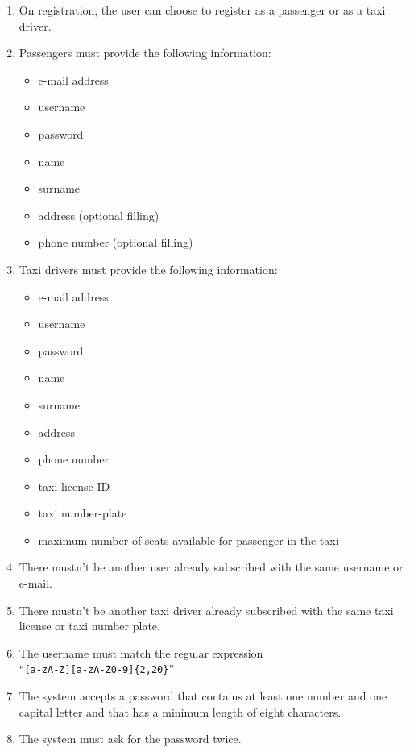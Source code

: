 \begin{enumerate}
    \item On registration, the user can choose to register as a passenger or as a taxi driver.
    \item Passengers must provide the following information:
    \begin{itemize}
        \item e-mail address
        \item username
        \item password
        \item name
        \item surname
        \item address (optional filling)
        \item phone number (optional filling)
    \end{itemize}
    \item Taxi drivers must provide the following information:
    \begin{itemize}
        \item e-mail address
        \item username
        \item password
        \item name
        \item surname
        \item address
        \item phone number
        \item taxi license ID
        \item taxi number-plate
        \item maximum number of seats available for passenger in the taxi
	   \end{itemize}
    \item There mustn't be another user already subscribed with the same username or e-mail. \label{f-sameInfo}
    \item There mustn't be another taxi driver already subscribed with the same taxi license or taxi number plate. \label{f-sameTaxi}
    \item The username must match the regular expression\\``\texttt{[a-zA-Z][a-zA-Z0-9]\{2,20\}}''    \label{f-usrn}
    \item The system accepts a password that contains at least one number and one capital letter and that has a minimum length of eight characters.  \label{f-psw1}
    \item The system must ask for the password twice.

\end{enumerate}

